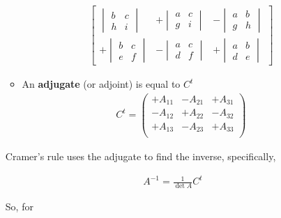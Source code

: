 \begin{itemize}
\begin{itemize}
\begin{align*}
\begin{bmatrix}
\begin{vmatrix}
            b & c\\
            h & i
          \end{vmatrix}
          &
          + \begin{vmatrix}
            a & c\\
            g & i
          \end{vmatrix}
          &
          - \begin{vmatrix}
            a & b\\
            g & h
          \end{vmatrix}\\
          + \begin{vmatrix}
            b & c\\
            e & f
          \end{vmatrix}
          &
          - \begin{vmatrix}
            a & c\\
            d & f
          \end{vmatrix}
          &
          + \begin{vmatrix}
            a & b\\
            d & e
          \end{vmatrix}
            \end{bmatrix}
        \end{align*}
      \item An \textbf{adjugate} (or adjoint) is equal to $C^t$
        \begin{align*}
          C^t =
          \begin{pmatrix}
            + A_{11} & - A_{21} & + A_{31}\\
            - A_{12} & + A_{22} & - A_{32}\\
            + A_{13} & - A_{23} & + A_{33}\\
          \end{pmatrix}
        \end{align*}
    \end{itemize}
    Cramer's rule uses the adjugate to find the inverse, specifically,

    \begin{align*}
      A^{-1} = \frac{1}{\det A} C^t
    \end{align*}

    So, for


\end{itemize}
